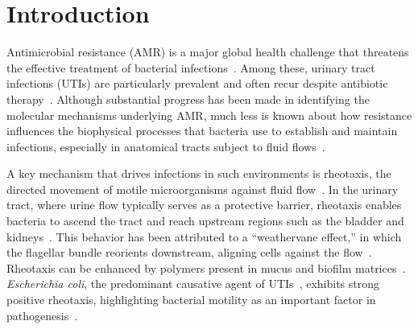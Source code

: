 \documentclass[twoside,twocolumn,9pt]{article}
\begin{document}




\section*{Introduction}
    Antimicrobial resistance (AMR) is a major global health challenge that threatens the effective treatment of bacterial infections~\cite{WorldHealthOrganization2020TheDeath, UnitedNationsEnvironmentProgramme2023BracingResistance, Ho2025-za}. Among these, urinary tract infections (UTIs) are particularly prevalent and often recur despite antibiotic therapy~\cite{Flores-Mireles2015-fq}. Although substantial progress has been made in identifying the molecular mechanisms underlying AMR, much less is known about how resistance influences the biophysical processes that bacteria use to establish and maintain infections, especially in anatomical tracts subject to fluid flows~\cite{Guasto2012-da, Persat2015-rl, Wheeler2019NotPlankton, Secchi2020-ml, Mathijssen2026BiomedicalFunctionalities}.
    
    A key mechanism that drives infections in such environments is rheotaxis, the directed movement of motile microorganisms against fluid flow~\cite{Hill2007-wr, Kaya2012DirectColi, Figueroa-Morales2015-fx, Mathijssen2019-zy, Figueroa-Morales2020-mb, Jing2020-mj}. In the urinary tract, where urine flow typically serves as a protective barrier, rheotaxis enables bacteria to ascend the tract and reach upstream regions such as the bladder and kidneys~\cite{Flores-Mireles2015-fq,Siryaporn2015-mm}. This behavior has been attributed to a “weathervane effect,” in which the flagellar bundle reorients downstream, aligning cells against the flow~\cite{Hill2007-wr,Mathijssen2019-zy}. Rheotaxis can be enhanced by polymers present in mucus and biofilm matrices~\cite{Torres-Maldonado2024-mp,Cao2024-nm}. 
    \textit{Escherichia coli}, the predominant causative agent of UTIs~\cite{Flores-Mireles2015-fq}, exhibits strong positive rheotaxis, highlighting bacterial motility as an important factor in pathogenesis~\cite{Figueroa-Morales2020-mb, Tao2026-yc, Padron2026-kn}.
\end{document}
